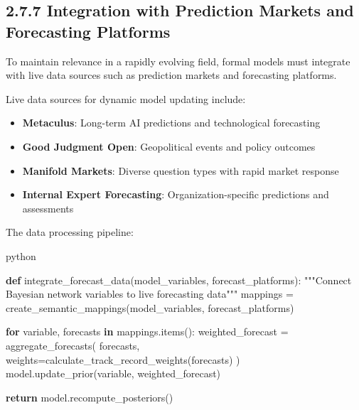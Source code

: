 \documentclass[
  11pt,
  letterpaper,
]{book}
\newenvironment{Shaded}{\begin{snugshade}}{\end{snugshade}}
\newcommand{\CommentTok}[1]{\textcolor[rgb]{0.37,0.37,0.37}{#1}}
\newcommand{\ControlFlowTok}[1]{\textcolor[rgb]{0.00,0.23,0.31}{\textbf{#1}}}
\newcommand{\KeywordTok}[1]{\textcolor[rgb]{0.00,0.23,0.31}{\textbf{#1}}}
\newcommand{\NormalTok}[1]{\textcolor[rgb]{0.00,0.23,0.31}{#1}}
\newcommand{\OperatorTok}[1]{\textcolor[rgb]{0.37,0.37,0.37}{#1}}
\providecommand{\tightlist}{%
  \setlength{\itemsep}{0pt}\setlength{\parskip}{0pt}}
\begin{document}
\subsection*{2.7.7 Integration with Prediction Markets and Forecasting
Platforms}\label{sec-prediction-markets}

To maintain relevance in a rapidly evolving field, formal models must
integrate with live data sources such as prediction markets and
forecasting platforms.

Live data sources for dynamic model updating include:

\begin{itemize}
\tightlist
\item
  \textbf{Metaculus}: Long-term AI predictions and technological
  forecasting
\item
  \textbf{Good Judgment Open}: Geopolitical events and policy outcomes
\item
  \textbf{Manifold Markets}: Diverse question types with rapid market
  response
\item
  \textbf{Internal Expert Forecasting}: Organization-specific
  predictions and assessments
\end{itemize}

The data processing pipeline:

python

\begin{Shaded}
\begin{Highlighting}[]
\KeywordTok{def}\NormalTok{ integrate\_forecast\_data(model\_variables, forecast\_platforms):}
    \CommentTok{"""Connect Bayesian network variables to live forecasting data"""}
\NormalTok{    mappings }\OperatorTok{=}\NormalTok{ create\_semantic\_mappings(model\_variables, forecast\_platforms)}
    
    \ControlFlowTok{for}\NormalTok{ variable, forecasts }\KeywordTok{in}\NormalTok{ mappings.items():}
\NormalTok{        weighted\_forecast }\OperatorTok{=}\NormalTok{ aggregate\_forecasts(}
\NormalTok{            forecasts, }
\NormalTok{            weights}\OperatorTok{=}\NormalTok{calculate\_track\_record\_weights(forecasts)}
\NormalTok{        )}
\NormalTok{        model.update\_prior(variable, weighted\_forecast)}
    
    \ControlFlowTok{return}\NormalTok{ model.recompute\_posteriors()}
\end{Highlighting}
\end{Shaded}
\end{document}
